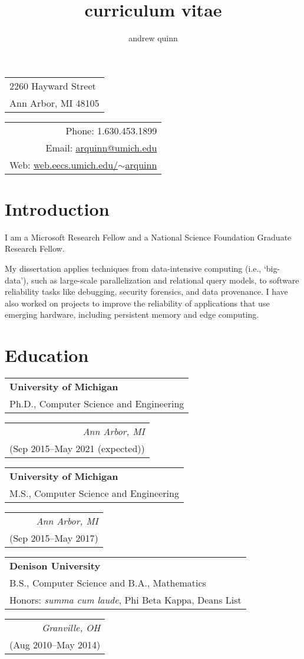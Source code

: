 \documentclass[letterpaper,10pt]{article}
\title{curriculum vitae}
\author{andrew quinn}
\makeatletter
\newcommand{\reitem}[2]{
  \begin{tabular}[t]{l}
    #2
  \end{tabular}
\hfill
\begin{tabular}[t]{r}
  #1
\end{tabular}
}
\newcommand{\quadItem}[4]{\reitem{\emph{#1}\\#2}{\textbf{#3}\\#4}}
\def \addr {2260 Hayward Street\\Ann Arbor, MI 48105}
\def \phone {1.630.453.1899}
\def \email {\href{mailto:arquinn@umich.edu}{arquinn@umich.edu}}
\def \website {\href{https://web.eecs.umich.edu/~arquinn}{web.eecs.umich.edu/$\sim$arquinn}}
\makeatother
\begin{document}
\maketitle
\setlength\parindent{0pt}
\setlength{\parskip}{3pt}


\begin{tabular}[t]{l}
  \addr
\end{tabular}
\hfill
\begin{tabular}[t]{r}
  Phone: \phone\\
  Email: \email\\
  Web: \website
\end{tabular}


\section{Introduction}

I am a Microsoft Research Fellow and a National Science Foundation Graduate
Research Fellow.

My dissertation applies techniques from data-intensive computing (i.e.,
`big-data'), such as large-scale parallelization and relational query models, to
software reliability tasks like debugging, security forensics, and data
provenance.  I have also worked on projects to improve the reliability of
applications that use emerging hardware, including persistent memory and edge
computing.

\section{Education}

\quadItem{Ann Arbor, MI}{(Sep 2015--May 2021 (expected))}{University of
  Michigan}{Ph.D., Computer Science and Engineering}

\quadItem{Ann Arbor, MI}{(Sep 2015--May 2017)}{University of Michigan}{M.S.,
  Computer Science and Engineering}

\quadItem{Granville, OH}{(Aug 2010--May 2014)}{Denison University}{B.S.,
  Computer Science and B.A., Mathematics\\ Honors: \textit{summa cum
    laude}, Phi Beta Kappa, Deans List}
\end{document}
